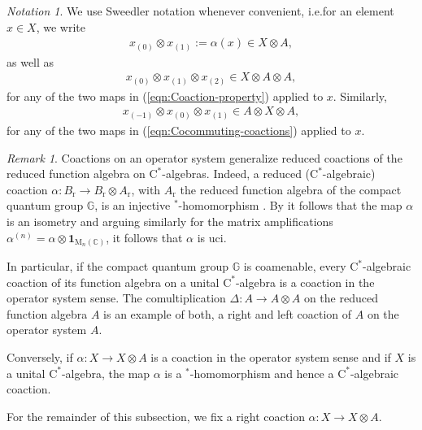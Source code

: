 \documentclass{amsart}
\theoremstyle{plain}
\theoremstyle{definition}
\theoremstyle{remark}
\newtheorem{remark}[theorem]{Remark}
\newtheorem{notation}[theorem]{Notation}
\begin{document}
	\begin{notation}
		We use Sweedler notation whenever convenient, i.e.\@ for an element $x \in X$, we write 
		\begin{align}
			x_{(0)} \otimes x_{(1)} := \alpha(x) \in X \otimes A,
		\end{align}
		as well as
		\begin{align}
			x_{(0)} \otimes x_{(1)} \otimes x_{(2)} \in X \otimes A \otimes A,
		\end{align}
		for any of the two maps in (\ref{eqn:Coaction-property}) applied to $x$.
		Similarly,
		\begin{align}
			x_{(-1)} \otimes x_{(0)} \otimes x_{(1)} \in A \otimes X \otimes A,
		\end{align}
		for any of the two maps in (\ref{eqn:Cocommuting-coactions}) applied to $x$.
	\end{notation}
	
	\begin{remark}
		Coactions on an operator system generalize reduced coactions of the reduced function algebra on $\mathrm{C}^*$-algebras.
		Indeed, a reduced ($\mathrm{C}^*$-algebraic) coaction $\alpha : B_\mathrm{r} \rightarrow B_\mathrm{r} \otimes A_\mathrm{r}$, with $A_\mathrm{r}$ the reduced function algebra of the compact quantum group $\mathbb{G}$, is an injective $^*$-homomorphism \cite[Proposition 3.4]{Li09}.
		By \cite[Corollary II.2.2.9]{Bla06} it follows that the map $\alpha$ is an isometry and arguing similarly for the matrix amplifications $\alpha^{(n)} = \alpha \otimes \mathbf{1}_{\mathrm{M}_n(\mathbb{C})}$, it follows that $\alpha$ is uci.
		
		In particular, if the compact quantum group $\mathbb{G}$ is coamenable, every $\mathrm{C}^*$-algebraic coaction of its function algebra on a unital $\mathrm{C}^*$-algebra is a coaction in the operator system sense.
		The comultiplication $\Delta : A \rightarrow A \otimes A$ on the reduced function algebra $A$ is an example of both, a right and left coaction of $A$ on the operator system $A$.
		
		Conversely, if $\alpha : X \rightarrow X \otimes A$ is a coaction in the operator system sense and if $X$ is a unital $\mathrm{C}^*$-algebra, the map $\alpha$ is a $^*$-homomorphism \cite[Proposition 3.7]{dRH24} and hence a $\mathrm{C}^*$-algebraic coaction.
	\end{remark}
	
	For the remainder of this subsection, we fix a right coaction $\alpha : X \rightarrow X \otimes A$.
	
\end{document}
